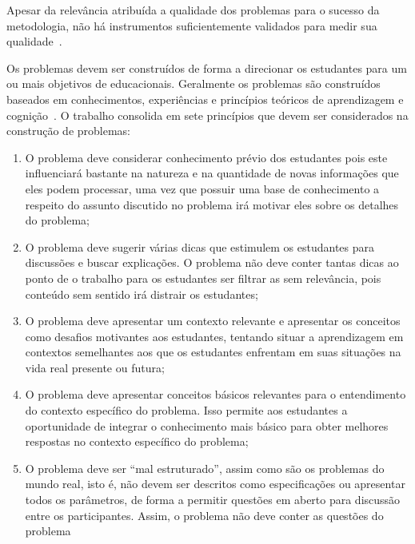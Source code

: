 Apesar da relevância atribuída a qualidade dos problemas para o
sucesso da metodologia, não há instrumentos suficientemente
validados para medir sua
qualidade~\cite{des1999delphi,sockalingam2012assessing}.

Os problemas devem ser construídos de forma a
direcionar os estudantes
para um ou mais objetivos de educacionais.
Geralmente os problemas são construídos baseados em conhecimentos,
experiências e princípios teóricos de aprendizagem e
cognição~\cite{des1999delphi,dolmans1997seven}.
O trabalho \cite{dolmans1997seven} consolida em sete
princípios que devem ser considerados na construção
de problemas:

\begin{enumerate}
\item{O problema deve considerar conhecimento
prévio dos estudantes pois este influenciará bastante na
natureza e na quantidade de novas informações que
eles podem processar, uma vez que possuir
uma base de conhecimento a respeito do assunto
discutido no problema irá motivar eles sobre os
detalhes do problema;}
\item{O problema deve sugerir várias dicas
que estimulem os estudantes para discussões
e buscar explicações. O problema não deve
conter tantas dicas ao ponto de o trabalho
para os estudantes ser filtrar as sem relevância,
pois conteúdo sem sentido irá distrair
os estudantes;}
\item{O problema deve apresentar um contexto relevante e
apresentar os conceitos como desafios motivantes aos
estudantes, tentando situar a aprendizagem em contextos
semelhantes aos que os estudantes enfrentam em suas
situações na vida real presente ou futura;}
\item{O problema deve apresentar conceitos básicos
relevantes para o entendimento do contexto específico
do problema.
Isso permite aos estudantes a oportunidade
de integrar o conhecimento mais básico para obter melhores
respostas no contexto específico do problema;}
\item{O problema deve ser ``mal estruturado'', assim como
são os problemas do mundo real, isto é, não
devem ser descritos como especificações ou apresentar
todos os parâmetros, de forma a permitir questões em
aberto para discussão entre os participantes.
Assim, o problema não deve conter as questões do problema
}
\end{enumerate}
